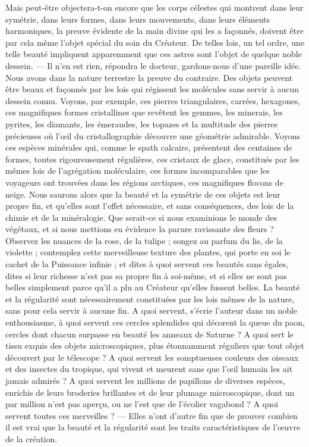 \documentclass[a4paper, 11pt, oneside]{article}
\begin{document}
Mais peut-être objectera-t-on encore que les corps célestes qui montrent dans leur symétrie, dans leurs formes, dans leurs mouvements, dans leurs éléments harmoniques, la preuve évidente de la main divine qui les a façonnés, doivent être par cela même l'objet spécial du soin du Créateur. De telles lois, un tel ordre, une telle beauté impliquent apparemment que ces astres sont l'objet de quelque noble dessein. --- Il n'en est rien, répondra le docteur, gardons-nous d'une pareille idée. Nous avons dans la nature terrestre la preuve du contraire. Des objets peuvent être beaux et façonnés par les lois qui régissent les molécules sans servir à aucun dessein connu. Voyons, par exemple, ces pierres triangulaires, carrées, hexagones, ces magnifiques formes cristallines que revêtent les gemmes, les minerais, les pyrites, les diamants, les émeraudes, les topazes et la multitude des pierres précieuses où l'œil du cristallographie découvre une géométrie admirable. Voyons ces espèces minérales qui, comme le spath calcaire, présentent des centaines de formes, toutes rigoureusement régulières, ces cristaux de glace, constitués par les mêmes lois de l'agrégation moléculaire, ces formes incomparables que les voyageurs ont trouvées dans les régions arctiques, ces magnifiques flocons de neige. Nous saurons alors que la beauté et la symétrie de ces objets est leur propre fin, et qu'elles sont l'effet nécessaire, et sans conséquences, des lois de la chimie et de la minéralogie. Que serait-ce si nous examinions le monde des végétaux, et si nous mettions eu évidence la parure ravissante des fleurs ? Observez les nuances de la rose, de la tulipe ; songez au parfum du lis, de la violette ; contemplez cette merveilleuse texture des plantes, qui porte en soi le cachet de la Puissance infinie ; et dites à quoi servent ces beautés sans égales, dites si leur richesse n'est pas sa propre fin à soi-même, et si elles ne sont pas belles simplement parce qu'il a plu au Créateur qu'elles fussent belles. La beauté et la régularité sont nécessairement constituées par les lois mêmes de la nature, sans pour cela servir à aucune fin. A quoi servent, s'écrie l'auteur dans un noble enthousiasme, à quoi servent ces cercles splendides qui décorent la queue du paon, cercles dont chacun surpasse en beauté les anneaux de Saturne ? A quoi sert le tissu exquis des objets microscopiques, plus étonnamment réguliers que tout objet découvert par le télescope ? A quoi servent les somptueuses couleurs des oiseaux et des insectes du tropique, qui vivent et meurent sans que l'œil humain les ait jamais admirés ? A quoi servent les millions de papillons de diverses espèces, enrichis de leurs broderies brillantes et de leur plumage microscopique, dont un par million n'est pas aperçu, ou ne l'est que de l'écolier vagabond ? A quoi servent toutes ces merveilles ? --- Elles n'ont d'autre fin que de prouver combien il est vrai que la beauté et la régularité sont les traits caractéristiques de l'œuvre de la création.
\end{document}
